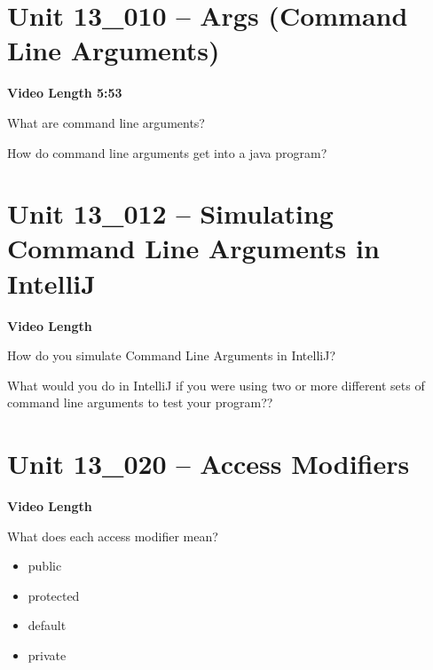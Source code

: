 \documentclass[letterpaper,12pt]{exam}
\newcommand{\unit}{Unit 13}
\begin{document}
\section*{\unit\_010 -- Args (Command Line Arguments)} 
\par{\selectfont\textbf{Video Length 5:53}}
\begin{questions}
\begin{samepage}
    \question What are command line arguments?
    \vspace{5mm}
\end{samepage}
\begin{samepage}
    \question How do command line arguments get into a java program?
    \vspace{5mm}
\end{samepage}

\section*{\unit\_012 -- Simulating Command Line Arguments in IntelliJ} 
\par{\selectfont\textbf{Video Length }}

\begin{samepage}
    \question How do you simulate Command Line Arguments in IntelliJ?
    \vspace{5mm}
\end{samepage}

\begin{samepage}
    \question What would you do in IntelliJ if you were using two or more different sets of command line arguments to test your program??
    \vspace{5mm}
\end{samepage}
\section*{\unit\_020 -- Access Modifiers} 
\par{\selectfont\textbf{Video Length }}

\begin{samepage}
    \question What does each access modifier mean?
      \begin{itemize}
        \item public
        \vspace{5mm}
        \item protected
        \vspace{5mm}
        \item default
        \vspace{5mm}
        \item private
        \vspace{5mm}
       \end{itemize}
\end{samepage}


\end{questions}
\end{document}
